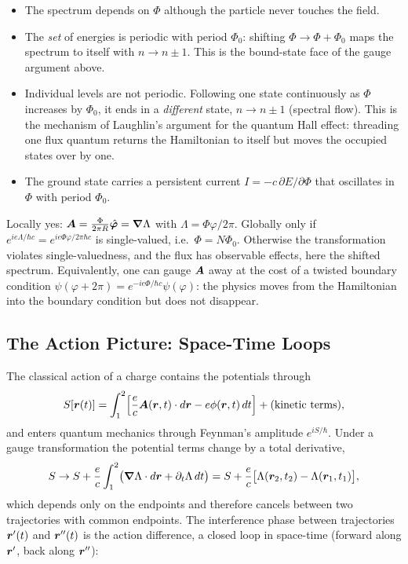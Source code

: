 \begin{itemize}
    \item The spectrum depends on $\Phi$ although the particle never touches the field.
    \item The \emph{set} of energies is periodic with period $\Phi_0$: shifting $\Phi\to\Phi+\Phi_0$ maps the spectrum to itself with $n\to n\pm1$. This is the bound-state face of the gauge argument above.
    \item Individual levels are not periodic. Following one state continuously as $\Phi$ increases by $\Phi_0$, it ends in a \emph{different} state, $n\to n\pm1$ (spectral flow). This is the mechanism of Laughlin's argument for the quantum Hall effect: threading one flux quantum returns the Hamiltonian to itself but moves the occupied states over by one.
    \item The ground state carries a persistent current $I = -c\,\partial E/\partial\Phi$ that oscillates in $\Phi$ with period $\Phi_0$.
\end{itemize}

\begin{example}
Locally yes: $\vect{A} = \frac{\Phi}{2\pi R}\hat{\bm{\varphi}} = \grad\Lambda$ with $\Lambda = \Phi\varphi/2\pi$. Globally only if $e^{ie\Lambda/\hbar c} = e^{ie\Phi\varphi/2\pi\hbar c}$ is single-valued, i.e.\ $\Phi = N\Phi_0$. Otherwise the transformation violates single-valuedness, and the flux has observable effects, here the shifted spectrum. Equivalently, one can gauge $\vect{A}$ away at the cost of a twisted boundary condition $\psi(\varphi+2\pi) = e^{-ie\Phi/\hbar c}\psi(\varphi)$: the physics moves from the Hamiltonian into the boundary condition but does not disappear.
\end{example}

\subsection{The Action Picture: Space-Time Loops}

The classical action of a charge contains the potentials through
\[
    S[\lvect{r}(t)] = \int_1^2\Bigl[\frac ec\vect{A}(\lvect{r},t)\cdot d\lvect{r} - e\phi(\lvect{r},t)\,dt\Bigr] + (\text{kinetic terms}),
\]
and enters quantum mechanics through Feynman's amplitude $e^{iS/\hbar}$. Under a gauge transformation the potential terms change by a total derivative,
\[
    S\to S + \frac ec\int_1^2\bigl(\grad\Lambda\cdot d\bm{r} + \partial_t\Lambda\,dt\bigr) = S + \frac ec\bigl[\Lambda(\bm{r}_2,t_2) - \Lambda(\bm{r}_1,t_1)\bigr],
\]
which depends only on the endpoints and therefore cancels between two trajectories with common endpoints. The interference phase between trajectories $\bm{r}'(t)$ and $\bm{r}''(t)$ is the action difference, a closed loop in space-time (forward along $\bm{r}'$, back along $\bm{r}''$):



